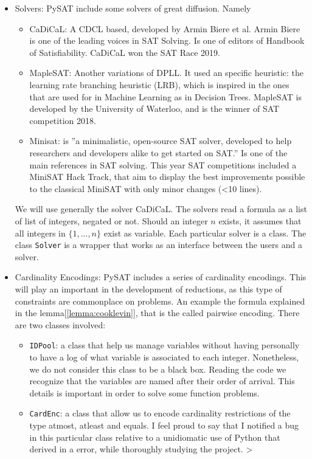 \begin{itemize}
\item Solvers:  PySAT include some solvers of great diffusion. Namely
  \begin{itemize}
  \item CaDiCaL: A CDCL based, developed by Armin Biere et al. Armin Biere is one of the leading voices in SAT Solving. Is one of editors of Handbook of Satisfiability. CaDiCaL won the SAT Race 2019.
  \item MapleSAT: Another variations of DPLL. It used an specific heuristic: the learning rate branching heuristic (LRB), which is inspired in the ones that are used for in Machine Learning as in Decision Trees. MapleSAT is developed by the University of Waterloo, and is the winner of SAT competition 2018.
  \item Minisat: is ''a minimalistic, open-source SAT solver, developed to help researchers and developers alike to get started on SAT.'' Is one of the main references in SAT solving. This year SAT competitions included a MiniSAT Hack Track, that aim to display the best improvements possible to the classical MiniSAT with only minor changes (<10 lines).
  \end{itemize}

  We will use generally the solver CaDiCaL. The solvers read a formula as a list of list of integers, negated or not. Should an integer $n$ exists, it assumes that all integers in $\{1,...,n\}$ exist as variable. Each particular solver is a class. The class \texttt{Solver} is a wrapper that works as an interface between the users and a solver. 


  
\item Cardinality Encodings: PySAT includes a series of cardinality encodings.  This will play an important in the development of reductions, as this type of constraints are commonplace on problems. An example the formula explained in the lemma[\ref{lemma:cooklevin}], that is the called pairwise encoding. There are two classes involved:
  \begin{itemize}
  \item \texttt{IDPool}: a class that help us manage variables without having personally to have a log of what variable is associated to each integer. Nonetheless, we do not consider this class to be a black box. Reading the code we recognize that the variables are named after their order of arrival. This details is important in order to solve some function problems.
  \item \texttt{CardEnc}: a class that allow us to encode cardinality restrictions of the type atmost, atleast and equals. I feel proud to say that I notified a bug in this particular class relative to a unidiomatic use of Python that derived in a error, while thoroughly studying the project.  
>  \end{itemize}

\end{itemize}


